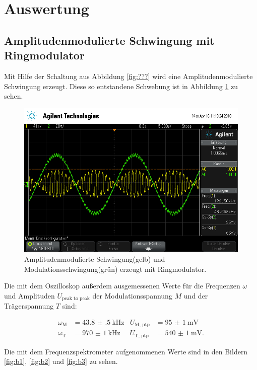 \section{Auswertung}
\label{sec:Auswertung}

\subsection{Amplitudenmodulierte Schwingung mit Ringmodulator}

Mit Hilfe der Schaltung aus Abbildung \ref{fig:???} wird eine Amplitudenmodulierte Schwingung erzeugt.
Diese so entstandene Schwebung ist in Abbildung \ref{fig:amplModOszi} zu sehen.

\begin{figure}[H]
  \centering
  \includegraphics[width=\textwidth]{Oszi_Pics/amplModRing.png}
  \caption{Amplitudenmodulierte Schwingung(gelb) und Modulationsschwingung(grün) erzeugt mit Ringmodulator.}
  \label{fig:amplModOszi}
\end{figure}

Die mit dem Oszilloskop außerdem ausgemessenen Werte für die Frequenzen $\omega$ und Amplituden $U_\text{peak to peak}$ der Modulationsspannung $M$ und der Trägerspannung $T$ sind:

\begin{align*}
  \omega_\text{M} &= \SI{43.8(5)}{\kilo\hertz} & U_\text{M, ptp} &= \SI{95(1)}{\milli\volt}\\
  \omega_\text{T} &= \SI{970(1)}{\kilo\hertz} & U_\text{T, ptp} &= \SI{540(1)}{\milli\volt}.
\end{align*}

Die mit dem Frequenzspektrometer aufgenommenen Werte sind in den Bildern \ref{fig:b1}, \ref{fig:b2} und \ref{fig:b3} zu sehen.

